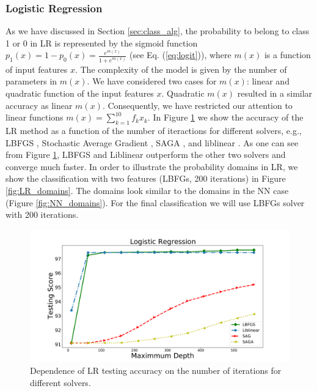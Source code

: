 \subsubsection{Logistic Regression}

As we have discussed in Section \ref{sec:class_alg}, 
the probability to belong to class 1 or 0 in LR is represented by the sigmoid function
$p_1(x) = 1 - p_0(x) = \frac{e^{m(x)}}{1 + e^{m(x)}}$ (see Eq. (\ref{eq:logit})),
where $m(x)$ is a function of input features $x$.
The complexity of the model is given by the number of parameters in $m(x)$.
We have considered two cases for $m(x)$: linear and quadratic function of the input features $x$.
Quadratic $m(x)$ resulted in a similar accuracy as linear $m(x)$.
Consequently, we have restricted our attention to linear functions $m(x) = \sum_{k = 1}^{10} f_k x_k$.
In Figure \ref{fig:LR_accuracy} we show the accuracy of the LR method as a function of the number of iteractions
for different solvers, e.g., LBFGS \citep{lbfgs}, Stochastic Average Gradient \citep[SAG,][]{sag}, SAGA \citep[a variant of SAG,][]{saga},
and liblinear \citep[a special solver for LR and support vector machine classifications,][]{ll}.
As one can see from Figure \ref{fig:LR_accuracy}, LBFGS and Liblinear outperform the other two solvers and converge much faster.
In order to illustrate the probability domains in LR, we show the classification with two features (LBFGs, 200 iterations)
in Figure \ref{fig:LR_domains}. The domains look similar to the domains in the NN case (Figure \ref{fig:NN_domains}).
For the final classification we will use LBFGs solver with 200 iterations.


\begin{figure}[h]
\includegraphics[width=\twopicsp\textwidth]{plots/lr_train_assocnewfeat.pdf}
\caption{Dependence of LR testing accuracy on the number of iterations for different solvers.}
\label{fig:LR_accuracy}
\end{figure}



